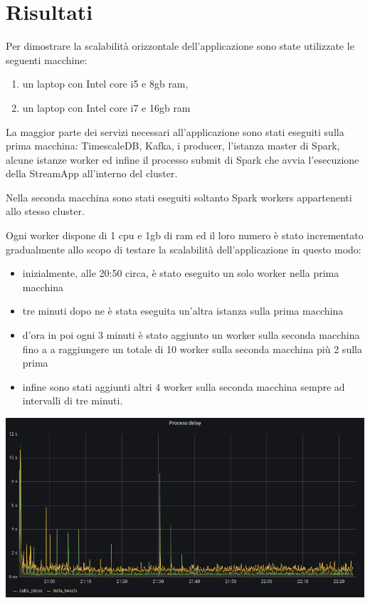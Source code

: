 \section{Risultati}

Per dimostrare la scalabilità orizzontale dell'applicazione sono state utilizzate le seguenti
macchine:

\begin{enumerate}
    \item un laptop con Intel core i5 e 8gb ram,
    \item un laptop con Intel core i7 e 16gb ram
\end{enumerate}

La maggior parte dei servizi necessari all'applicazione sono stati eseguiti sulla prima macchina:
TimescaleDB, Kafka, i producer, l'istanza master di Spark, alcune istanze worker ed
infine il processo submit di Spark che avvia l'esecuzione della StreamApp all'interno del cluster.

Nella seconda macchina sono stati eseguiti soltanto Spark workers appartenenti allo stesso cluster.

Ogni worker dispone di 1 cpu e 1gb di ram ed il loro numero è stato incrementato gradualmente
allo scopo di testare la scalabilità dell'applicazione in questo modo:

\begin{itemize}
    \item inizialmente, alle 20:50 circa, è stato eseguito un solo worker nella prima macchina
    \item tre minuti dopo ne è stata eseguita un'altra istanza sulla prima macchina
    \item d'ora in poi ogni 3 minuti è stato aggiunto un worker sulla seconda macchina fino a
          a raggiungere un totale di 10 worker sulla seconda macchina più 2 sulla prima
    \item infine sono stati aggiunti altri 4 worker sulla seconda macchina sempre ad intervalli di
          tre minuti.
\end{itemize}

\begin{center}
    \includegraphics[max width=\linewidth]{process_delay.png}
    \label{processdelay}
\end{center}


